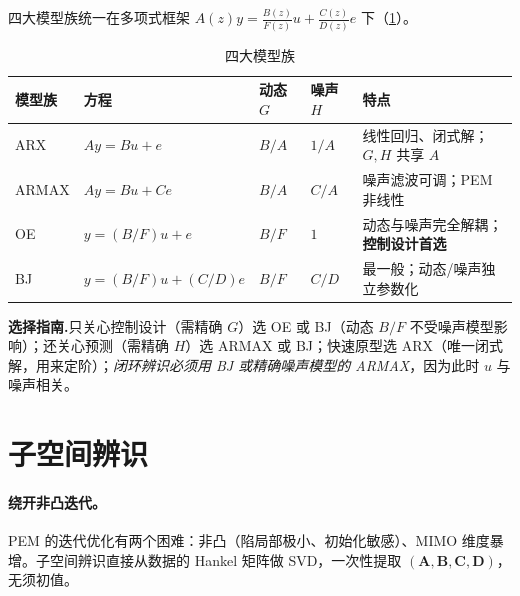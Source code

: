 四大模型族统一在多项式框架 $A(z)y=\tfrac{B(z)}{F(z)}u+\tfrac{C(z)}{D(z)}e$ 下（\cref{tab:model-family}）。

\begin{table}[H]\centering\small
\caption{四大模型族}
\label{tab:model-family}
\begin{tabular}{lllll}
\toprule
模型族 & 方程 & 动态 $G$ & 噪声 $H$ & 特点 \\
\midrule
ARX & $Ay=Bu+e$ & $B/A$ & $1/A$ & 线性回归、闭式解；$G,H$ 共享 $A$ \\
ARMAX & $Ay=Bu+Ce$ & $B/A$ & $C/A$ & 噪声滤波可调；PEM 非线性 \\
OE & $y=(B/F)u+e$ & $B/F$ & $1$ & 动态与噪声完全解耦；\textbf{控制设计首选} \\
BJ & $y=(B/F)u+(C/D)e$ & $B/F$ & $C/D$ & 最一般；动态/噪声独立参数化 \\
\bottomrule
\end{tabular}
\end{table}

\noindent\textbf{选择指南.}\;只关心控制设计（需精确 $G$）选 OE 或 BJ（动态 $B/F$ 不受噪声模型影响）；还关心预测（需精确 $H$）选 ARMAX 或 BJ；快速原型选 ARX（唯一闭式解，用来定阶）；\emph{闭环辨识必须用 BJ 或精确噪声模型的 ARMAX}，因为此时 $u$ 与噪声相关。

\section{子空间辨识}
\label{sec:subspace}

\paragraph{绕开非凸迭代。}
PEM 的迭代优化有两个困难：非凸（陷局部极小、初始化敏感）、MIMO 维度暴增。子空间辨识直接从数据的 Hankel 矩阵做 SVD，一次性提取 $(\mathbf A,\mathbf B,\mathbf C,\mathbf D)$，无须初值。

